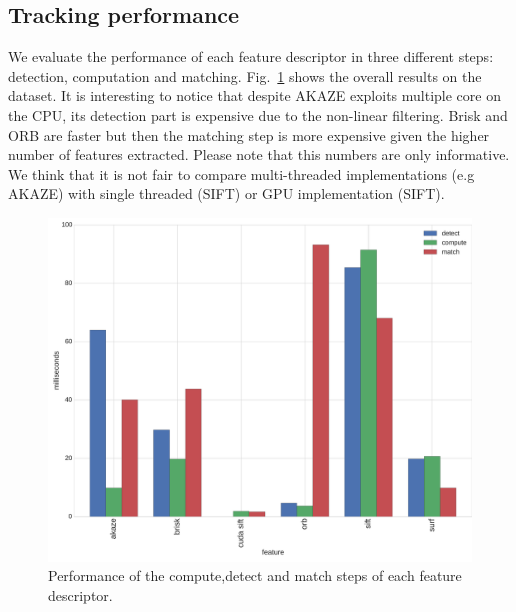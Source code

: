 \subsection{Tracking performance}

We evaluate the performance of each feature descriptor in three different steps: detection, computation and matching. Fig.~\ref{fig:speed} shows the overall results on the dataset. It is interesting to notice that despite AKAZE exploits multiple core on the CPU, its detection part is expensive due to the non-linear filtering. Brisk and ORB are faster but then the matching step is more expensive given the higher number of features extracted. Please note that this numbers are only informative. We think that it is not fair to compare multi-threaded implementations (e.g AKAZE) with single threaded (SIFT) or GPU implementation (SIFT).

\begin{figure}
	\includegraphics[width=0.95\linewidth]{imgs/performances.pdf}
\vspace{-2.5mm}	
\caption{Performance of the compute,detect and match steps of each feature descriptor.}
\label{fig:speed}
\end{figure}

